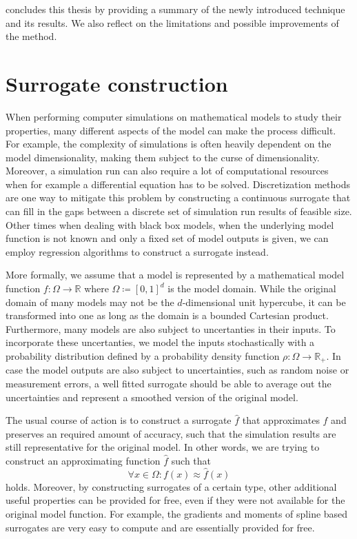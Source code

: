 \documentclass[
  a4paper,  %
  twoside,  %
  bibliography=totoc,
  headsepline,
  cleardoublepage=empty,
  parskip=half,
  draft=false
]{scrbook}
\begin{document}
 concludes this thesis by providing a summary of the newly introduced technique and its results.
We also reflect on the limitations and possible improvements of the method.

\chapter{Surrogate construction}
\label{chap:c2}

When performing computer simulations on mathematical models to study their properties, many different aspects of the model can make the process difficult.
For example, the complexity of simulations is often heavily dependent on the model dimensionality, making them subject to the curse of dimensionality.
Moreover, a simulation run can also require a lot of computational resources when for example a differential equation has to be solved.
Discretization methods are one way to mitigate this problem by constructing a continuous surrogate that can fill in the gaps between a discrete set of simulation run results of feasible size.
Other times when dealing with black box models, \ie when the underlying model function is not known and only a fixed set of model outputs is given, we can employ regression algorithms to construct a surrogate instead.

More formally, we assume that a model is represented by a mathematical model function $f \colon \Omega \to \mathds{R}$ where $\Omega \coloneqq [0,1]^d$ is the model domain.
While the original domain of many models may not be the $d$-dimensional unit hypercube, it can be transformed into one as long as the domain is a bounded Cartesian product.
Furthermore, many models are also subject to uncertanties in their inputs.
To incorporate these uncertanties, we model the inputs stochastically with a probability distribution defined by a probability density function $\rho \colon \Omega \to \mathds{R_+}$.
In case the model outputs are also subject to uncertainties, such as random noise or measurement errors, a well fitted surrogate should be able to average out the uncertainties and represent a smoothed version of the original model.

The usual course of action is to construct a surrogate $\hat{f}$ that approximates $f$ and preserves an required amount of accuracy, such that the simulation results are still representative for the original model.
In other words, we are trying to construct an approximating function $\hat{f}$ such that
\begin{equation}
\forall x \in \Omega \colon f(x) \approx \hat{f}(x)
\end{equation}
holds.
Moreover, by constructing surrogates of a certain type, other additional useful properties can be provided for free, even if they were not available for the original model function.
For example, the gradients and moments of spline based surrogates are very easy to compute and are essentially provided for free.
\end{document}
